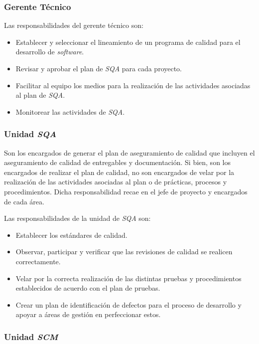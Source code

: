 \subsubsection{Gerente Técnico}

Las responsabilidades del gerente técnico son:

	\begin{itemize}
		\item 
		 Establecer y seleccionar el lineamiento de un programa de calidad para el desarrollo de \emph{software}.
		\item
		 Revisar y aprobar el plan de \emph{SQA} para cada proyecto. 
		 \item
		 Facilitar al equipo los medios para la realización de las actividades asociadas al plan de \emph{SQA}.
		 \item 
		 Monitorear las actividades de \emph{SQA}.
	\end{itemize}

\subsubsection{Unidad \emph{SQA}}

Son los encargados de generar el plan de aseguramiento de calidad que incluyen el aseguramiento de calidad de entregables y documentación. Si bien, son los encargados de realizar el plan de calidad, no son encargados de velar por la realización de las actividades asociadas al plan o de prácticas, procesos y procedimientos. Dicha responsabilidad recae en el jefe de proyecto y encargados de cada área.

Las responsabilidades de la unidad de \emph{SQA} son: 

	\begin{itemize}
		\item 
		 Establecer los estándares de calidad.
		\item
		 Observar, participar y verificar que las revisiones de calidad se realicen correctamente. 
		 \item
		Velar por la correcta realización de las distintas pruebas y procedimientos establecidos de acuerdo con el plan de pruebas.
		 \item 
		Crear un plan de identificación de defectos para el proceso de desarrollo y apoyar a áreas de gestión en perfeccionar estos.
	\end{itemize}

\subsubsection{Unidad \emph{SCM}}

